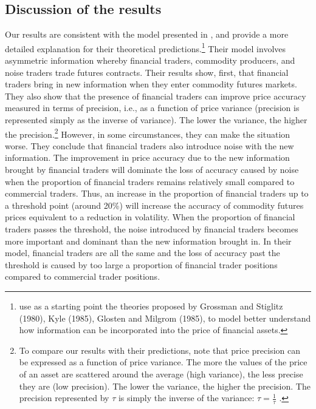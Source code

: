 \documentclass[12pt]{article}
\begin{document}
\subsection{Discussion of the results}%
Our results are consistent with the model presented in \citet{goldstein2019commodity}, and provide a more detailed explanation for their theoretical predictions.\footnote{\citet{goldstein2019commodity} use as a starting point the theories proposed by Grossman and Stiglitz (1980), Kyle (1985), Glosten and Milgrom (1985), to model better understand how information can be incorporated into the price of financial assets.} 
Their model involves asymmetric information whereby financial traders, commodity producers, and noise traders trade futures contracts. Their results show, first, that financial traders bring in new information when they enter  commodity futures markets. They also  show that the presence of financial traders can improve price accuracy measured in terms of precision, i.e., as a function of price variance (precision is represented simply as the inverse of variance). The lower the variance, the higher the precision.\footnote{To compare our results with their predictions, note that price  precision can be expressed as a function of price  variance. The more the values of the price of an asset are scattered around the average (high variance), the less precise they are (low precision).  The lower the variance, the higher the precision. The precision represented by $\tau$ is simply the inverse of the variance: $\tau=\frac{1}{\tau}$ .} However, in some circumstances, they can make the situation worse. They conclude that financial traders also introduce noise with the new information. The improvement in price accuracy due to the new information brought by financial traders will dominate the loss of accuracy caused by noise when the proportion of financial traders remains relatively small compared to commercial traders. Thus, an increase in the proportion of financial traders up to a threshold point (around 20\%) will increase the accuracy of commodity futures prices equivalent to a reduction in volatility. When the proportion of financial traders passes the threshold, the noise introduced by financial traders becomes more important and dominant than the new information brought in.
In their model, financial traders are all the same and the loss of accuracy past the threshold is caused by too large a proportion of financial trader positions compared to commercial trader positions. 
\end{document}
